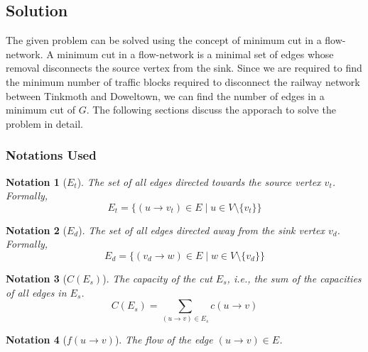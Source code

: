 \documentclass[12pt]{report}
\newtheorem{notation}{Notation}
\begin{document}
    \subsection*{Solution}
    The given problem can be solved using the concept of minimum cut in a flow-network.
    A minimum cut in a flow-network is a minimal set of edges whose removal disconnects the source vertex from the sink.
    Since we are required to find the minimum number of traffic blocks required to disconnect the railway network between Tinkmoth and Doweltown,
    we can find the number of edges in a minimum cut of $G$.
    The following sections discuss the apporach to solve the problem in detail.
    \vfill

    \subsubsection*{Notations Used}
    \begin{notation}[$E_{t}$]
        The set of all edges directed towards the source vertex $v_{t}$. Formally,
        \begin{equation}
            E_{t} = \{(u \to v_{t}) \in E \mid u \in V \setminus \{v_{t}\}\}
        \end{equation}
    \end{notation}

    \begin{notation}[$E_{d}$]
        The set of all edges directed away from the sink vertex $v_{d}$. Formally,
        \begin{equation}
            E_{d} = \{(v_{d} \to w) \in E \mid w \in V \setminus \{v_{d}\}\}
        \end{equation}
    \end{notation}

    \begin{notation}[$C(E_{s})$]
        The capacity of the cut $E_{s}$, i.e., the sum of the capacities of all edges in $E_{s}$.
        \begin{equation}
            C(E_{s}) = \sum_{(u \to v) \in E_{s}} c(u \to v)
        \end{equation}
    \end{notation}

    \begin{notation}[$f(u \to v)$]
        The flow of the edge $(u \to v) \in E$.
    \end{notation}
\end{document}
